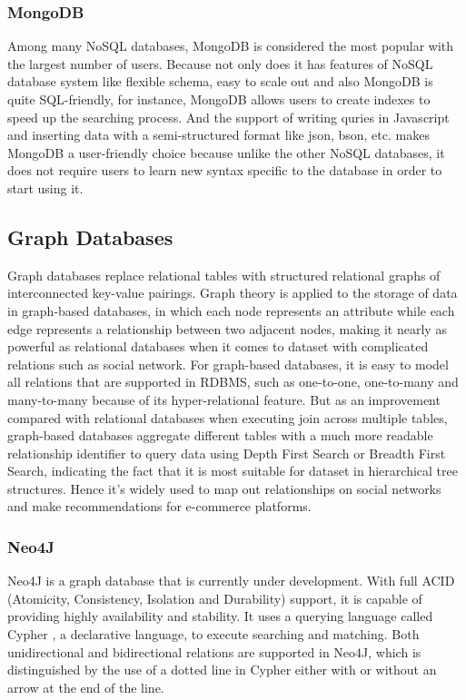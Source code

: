 \subsubsection{MongoDB}\mbox{}

 \noindent Among many NoSQL databases, MongoDB is considered the most popular with the largest number of users. Because not only does it has features of NoSQL database system like flexible schema, easy to scale out and also MongoDB is quite SQL-friendly, for instance, MongoDB allows users to create indexes to speed up the searching process. And the support of writing quries in Javascript and inserting data with a semi-structured format like json, bson, etc. makes MongoDB a user-friendly choice because unlike the other NoSQL databases, it does not require users to learn new syntax specific to the database in order to start using it.


\subsection{Graph Databases}\mbox{}

\noindent Graph databases replace relational tables with structured relational graphs of
interconnected key-value pairings\cite{DBLP:journals/corr/MoniruzzamanH13}. Graph theory is applied to the storage of data in graph-based databases, in which each node represents an attribute while each edge represents a relationship between two adjacent nodes, making it nearly as powerful as relational databases when it comes to dataset with complicated relations such as social network. For graph-based databases, it is easy to model all relations that are supported in RDBMS, such as one-to-one, one-to-many and many-to-many because of its hyper-relational feature. But as an improvement compared with relational databases when executing join across multiple tables, graph-based databases aggregate different tables with a much more readable relationship identifier to query data using Depth First Search or Breadth First Search, indicating the fact that it is most suitable for dataset in hierarchical tree structures. Hence it's widely used to map out relationships on social networks and make recommendations for e-commerce platforms.


\subsubsection{Neo4J}\mbox{}

\noindent Neo4J is a graph database that is currently under development. With full ACID \cite{Schram2012MySQLTN} (Atomicity, Consistency, Isolation and
Durability) support, it is capable of providing highly availability and stability. It uses a querying language called Cypher \cite{Webber2012API}, a declarative language, to execute searching and matching. Both unidirectional and bidirectional relations are supported in Neo4J, which is distinguished by the use of a dotted line in Cypher either with or without an arrow at the end of the line.

